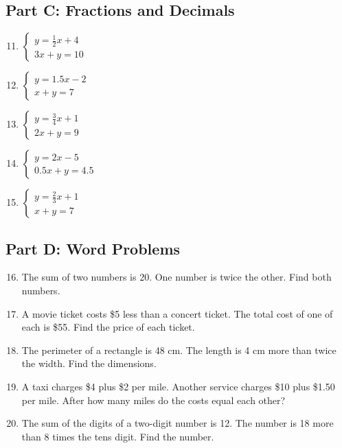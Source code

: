\documentclass[14pt]{extarticle}
\begin{document}
\subsection*{Part C: Fractions and Decimals}
\begin{enumerate}
    \setcounter{enumi}{10}
    \item \(\begin{cases} y = \tfrac{1}{2}x + 4 \\ 3x + y = 10 \end{cases}\)
    \item \(\begin{cases} y = 1.5x - 2 \\ x + y = 7 \end{cases}\)
    \item \(\begin{cases} y = \tfrac{3}{4}x + 1 \\ 2x + y = 9 \end{cases}\)
    \item \(\begin{cases} y = 2x - 5 \\ 0.5x + y = 4.5 \end{cases}\)
    \item \(\begin{cases} y = \tfrac{2}{3}x + 1 \\ x + y = 7 \end{cases}\)
\end{enumerate}

\subsection*{Part D: Word Problems}
\begin{enumerate}
    \setcounter{enumi}{15}
    \item The sum of two numbers is 20. One number is twice the other. Find both numbers.
    \item A movie ticket costs \$5 less than a concert ticket. The total cost of one of each is \$55. Find the price of each ticket.
    \item The perimeter of a rectangle is 48 cm. The length is 4 cm more than twice the width. Find the dimensions.
    \item A taxi charges \$4 plus \$2 per mile. Another service charges \$10 plus \$1.50 per mile. After how many miles do the costs equal each other?
    \item The sum of the digits of a two-digit number is 12. The number is 18 more than 8 times the tens digit. Find the number.
\end{enumerate}
\end{document}

